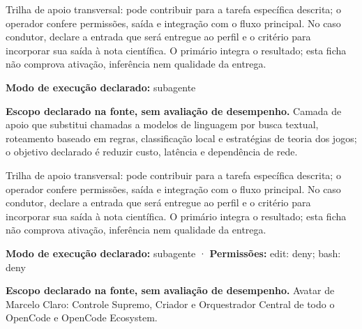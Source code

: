 \begin{funcao}
Trilha de apoio transversal: pode contribuir para a tarefa específica descrita; o operador confere permissões, saída e integração com o fluxo principal. No caso condutor, declare a entrada que será entregue ao perfil e o critério para incorporar sua saída à nota científica. O primário integra o resultado; esta ficha não comprova ativação, inferência nem qualidade da entrega.
\end{funcao}

\begin{arquitetura}
\textbf{Modo de execução declarado:} subagente
\end{arquitetura}


\begin{descricao}
\textbf{Escopo declarado na fonte, sem avaliação de desempenho.}
Camada de apoio que substitui chamadas a modelos de linguagem por busca textual, roteamento baseado em regras, classificação local e estratégias de teoria dos jogos; o objetivo declarado é reduzir custo, latência e dependência de rede.
\end{descricao}

\begin{funcao}
Trilha de apoio transversal: pode contribuir para a tarefa específica descrita; o operador confere permissões, saída e integração com o fluxo principal. No caso condutor, declare a entrada que será entregue ao perfil e o critério para incorporar sua saída à nota científica. O primário integra o resultado; esta ficha não comprova ativação, inferência nem qualidade da entrega.
\end{funcao}

\begin{arquitetura}
\textbf{Modo de execução declarado:} subagente · \textbf{Permissões:} edit: deny; bash: deny
\end{arquitetura}


\begin{descricao}
\textbf{Escopo declarado na fonte, sem avaliação de desempenho.}
Avatar de Marcelo Claro: Controle Supremo, Criador e Orquestrador Central de todo o OpenCode e OpenCode Ecosystem.
\end{descricao}

